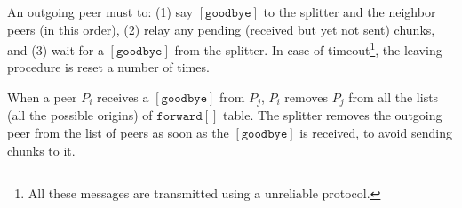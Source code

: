 
\label{sec:leaving}

An outgoing peer must to: (1) say $[\mathtt{goodbye}]$ to the splitter
and the neighbor peers (in this order), (2) relay any pending
(received but yet not sent) chunks, and (3) wait for a
$[\mathtt{goodbye}]$ from the splitter. In case of
timeout\footnote{All these messages are transmitted using a unreliable
  protocol.}, the leaving procedure is reset a number of times.

When a peer $P_i$ receives a $[\mathtt{goodbye}]$ from $P_j$, $P_i$
removes $P_j$ from all the lists (all the possible origins) of
$\mathtt{forward}[]$ table. The splitter removes the outgoing peer
from the list of peers as soon as the $[\mathtt{goodbye}]$ is
received, to avoid sending chunks to it.


\begin{comment}
\begin{figure*}
  \fig{400}{4cm}{leaving}
  \caption{Leaving a team.\label{fig:leaving}}
\end{figure*}

All these rules have been describen in Fig.~\ref{fig:leaving}.
\end{comment}

\begin{comment}
An outgoing peer $P_o$ (see Fig.~\ref{fig:leaving}) must to: (1) say
$[\mathtt{goodbye}]$ to $S$ and to $T^o$ (in this order), (2)
relay any pending (received but yet not sent) chunks, and (3) wait for
a $[\mathtt{goodbye}]$ from $S$, which performs $T = T \setminus
P_o$. In case of a timeout, $P_o$ resets the leaving procedure,
for a maximum number of times.

When a $P_k$ receives a $[\mathtt{goodbye}]$ from $P_o$, $P_k$
removes $P_o$ from its neighbors set, by running $T^k = T^k
\setminus P_o$.
\end{comment}
